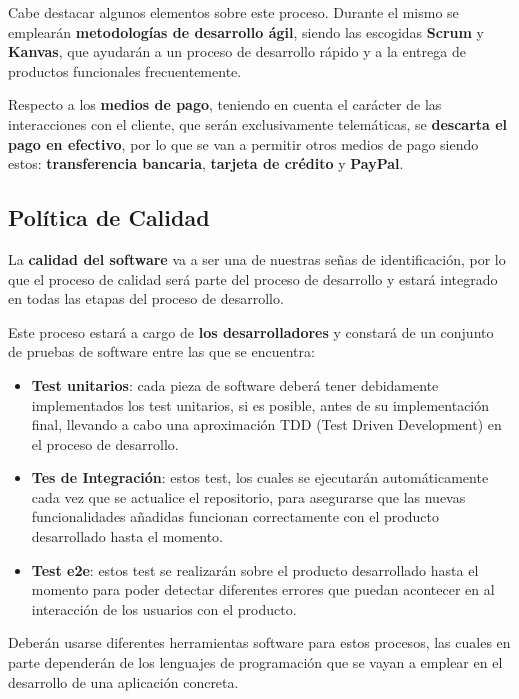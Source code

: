 Cabe destacar algunos elementos sobre este proceso. Durante el mismo se emplearán \textbf{metodologías de desarrollo ágil}, siendo las escogidas \textbf{Scrum} y \textbf{Kanvas}, que ayudarán a un proceso de desarrollo rápido y a la entrega de productos funcionales frecuentemente.

Respecto a los \textbf{medios de pago}, teniendo en cuenta el carácter de las interacciones con el cliente, que serán exclusivamente telemáticas, se \textbf{descarta el pago en efectivo}, por lo que se van a permitir otros medios de pago siendo estos: \textbf{transferencia bancaria}, \textbf{tarjeta de crédito} y \textbf{PayPal}.

\subsection{Política de Calidad}
La \textbf{calidad del software} va a ser una de nuestras señas de identificación, por lo que el proceso de calidad será parte del proceso de desarrollo y estará integrado en todas las etapas del proceso de desarrollo.

Este proceso estará a cargo de \textbf{los desarrolladores} y constará de un conjunto de pruebas de software entre las que se encuentra:

\begin{itemize}
    \item \textbf{Test unitarios}: cada pieza de software deberá tener debidamente implementados los test unitarios, si es posible, antes de su implementación final, llevando a cabo una aproximación TDD (Test Driven Development) en el proceso de desarrollo.

    \item \textbf{Tes de Integración}: estos test, los cuales se ejecutarán automáticamente cada vez que se actualice el repositorio, para asegurarse que las nuevas funcionalidades añadidas funcionan correctamente con el producto desarrollado hasta el momento.

    \item \textbf{Test e2e}: estos test se realizarán sobre el producto desarrollado hasta el momento para poder detectar diferentes errores que puedan acontecer en al interacción de los usuarios con el producto.
\end{itemize}

Deberán usarse diferentes herramientas software para estos procesos, las cuales en parte dependerán de los lenguajes de programación que se vayan a emplear en el desarrollo de una aplicación concreta.

